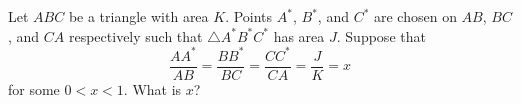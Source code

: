 Let $ABC$ be a triangle with area $K$. Points $A^*$, $B^*$, and $C^*$ are chosen on $AB$, $BC$, and $CA$ respectively such that $\triangle{A^*B^*C^*}$ has area $J$. Suppose that \[\frac{AA^*}{AB}=\frac{BB^*}{BC}=\frac{CC^*}{CA}=\frac{J}{K}=x\] for some $0<x<1$. What is $x$?